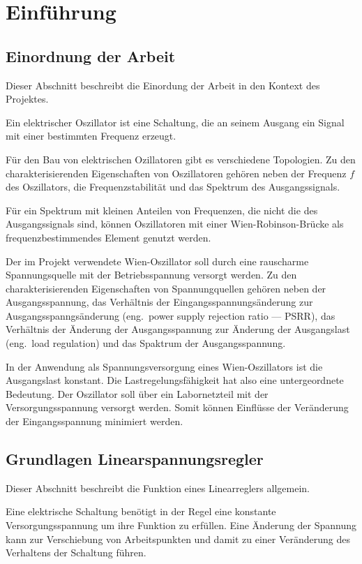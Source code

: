\chapter{Einführung} %

\section{Einordnung der Arbeit}
Dieser Abschnitt beschreibt die Einordung der Arbeit in den Kontext des 
Projektes.

Ein elektrischer Oszillator ist eine Schaltung, die an seinem Ausgang ein
Signal mit einer bestimmten Frequenz erzeugt.

Für den Bau von elektrischen Ozillatoren gibt es verschiedene Topologien.
Zu den charakterisierenden Eigenschaften von Oszillatoren gehören neben
der Frequenz $f$ des Oszillators, die Frequenzstabilität und das Spektrum des 
Ausgangssignals.

Für ein Spektrum mit kleinen Anteilen von Frequenzen, die nicht die des 
Ausgangssignals sind, können Oszillatoren mit einer Wien-Robinson-Brücke als 
frequenzbestimmendes Element genutzt werden.

Der im Projekt verwendete Wien-Oszillator soll durch eine rauscharme 
Spannungsquelle mit der Betriebsspannung versorgt werden.
Zu den charakterisierenden Eigenschaften von Spannungquellen gehören neben der
Ausgangsspannung, das Verhältnis der Eingangsspannungsänderung zur 
Ausgangsspanngsänderung (eng.\ power supply rejection ratio — PSRR),
das Verhältnis der Änderung der Ausgangsspannung zur Änderung der Ausgangslast
(eng.\ load regulation) und das Spaktrum der Ausgangsspannung.

In der Anwendung als Spannungsversorgung eines Wien-Oszillators ist die 
Ausgangslast konstant. Die Lastregelungsfähigkeit hat also eine untergeordnete
Bedeutung. Der Oszillator soll über ein Labornetzteil mit der 
Versorgungsspannung versorgt werden. Somit können Einflüsse der 
Veränderung der Eingangsspannung minimiert werden. 

\section{Grundlagen Linearspannungsregler}
Dieser Abschnitt beschreibt die Funktion eines Linearreglers allgemein.

Eine elektrische Schaltung benötigt in der Regel eine konstante 
Versorgungsspannung um ihre Funktion zu erfüllen.
Eine Änderung der Spannung kann zur Verschiebung von Arbeitspunkten und damit
zu einer Veränderung des Verhaltens der Schaltung führen.

